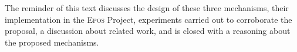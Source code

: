 The reminder of this text discusses the design of these three
mechanisms, their implementation in the \textsc{Epos} Project,
experiments carried out to corroborate the proposal, a discussion about
related work, and is closed with a reasoning about the proposed
mechanisms.


